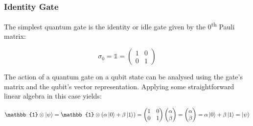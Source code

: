 

\subsubsection{Identity Gate}
\label{subsubsubsec:identitygate}

The simplest quantum gate is the identity or idle gate given by the 0\textsuperscript{th} Pauli matrix:

\begin{equation}
\sigma_{0} = \mathbb{1} = \begin{pmatrix}
 1 & 0 \\ 
 0 & 1
 \end{pmatrix}
\end{equation}

The action of a quantum gate on a qubit state can be analysed using the gate's matrix and the qubit's vector representation. Applying some straightforward linear algebra in this case yields:

\begin{equation}
\label{equ:identityverification}
\mathbb{1} \otimes \ket{\psi} = \mathbb{1} \otimes (\alpha \ket{0} + \beta \ket{1}) = \begin{pmatrix}
 1 & 0 \\ 
 0 & 1
 \end{pmatrix} \begin{pmatrix}
 \alpha  \\ 
 \beta
 \end{pmatrix} = \begin{pmatrix}
 \alpha  \\ 
 \beta
 \end{pmatrix} = \alpha \ket{0} + \beta \ket{1} = \ket{\psi}
\end{equation}

